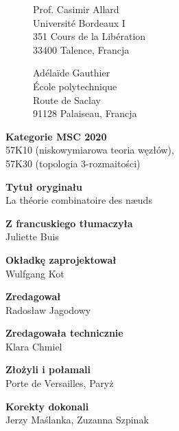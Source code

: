 

\thispagestyle{empty}
\begin{figure}[H]
\begin{minipage}[b]{.48\linewidth}
{\noindent Prof. Casimir Allard\\
Université Bordeaux I\\
351 Cours de la Libération\\
33400 Talence, Francja}
\end{minipage}
\begin{minipage}[b]{.48\linewidth}
{\noindent Adélaïde Gauthier\\
École polytechnique\\
Route de Saclay\\
91128 Palaiseau, Francja}
\end{minipage}
\end{figure}

{\noindent \textbf{Kategorie MSC 2020}\\57K10 (niskowymiarowa teoria węzłów),\\57K30 (topologia 3-rozmaitości)} \vspace{5mm}

{\noindent \textbf{Tytuł oryginału}\\La théorie combinatoire des næuds}
\vspace{5mm}

{\noindent \textbf{Z francuskiego tłumaczyła}\\Juliette Buis} 
\vspace{5mm}

{\noindent \textbf{Okładkę zaprojektował}\\Wulfgang Kot}
\vspace{5mm}

{\noindent \textbf{Zredagował}\\Radosław Jagodowy}
\vspace{5mm}

{\noindent \textbf{Zredagowała technicznie}\\Klara Chmiel}
\vspace{5mm}

{\noindent \textbf{Złożyli i połamali}\\Porte de Versailles, Paryż}
\vspace{5mm}

{\noindent \textbf{Korekty dokonali}\\Jerzy Maślanka, Zuzanna Szpinak}

\vfill

